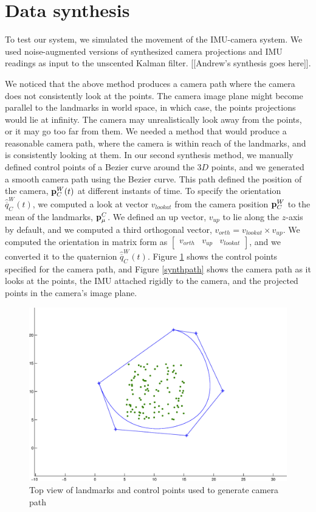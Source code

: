 \section{Data synthesis}
\label{Datasynth}
To test our system, we simulated the movement of the IMU-camera system. We used noise-augmented versions of synthesized camera projections and IMU readings as input to the unscented Kalman filter. [[Andrew's synthesis goes here]].

We noticed that the above method produces a camera path where the camera does not consistently look at the points. The camera image plane might become parallel to the landmarks in world space, in which case, the points projections would lie at infinity. The camera may unrealistically look away from the points, or it may go too far from them. We needed a method that would produce a reasonable camera path, where the camera is within reach of the landmarks, and is consistently looking at them. In our second synthesis method, we manually defined control points of a Bezier curve around the $3D$ points, and we generated a smooth camera path using the Bezier curve. This path defined the position of the camera, $\mathbf{p}_C^W(t)$ at different instants of time. To specify the orientation $\hat{\overline{q}}_C^W(t)$, we computed a look at vector $v_{lookat}$ from the camera position $\mathbf{p}_C^W$ to the mean of the landmarks, $\mathbf{p}_{\mu}^C$. We defined an up vector, $v_{up}$ to lie along the $z$-axis by default, and we computed a third orthogonal vector, $v_{orth}=v_{lookat} \times v_{up}$. We computed the orientation in matrix form as $\begin{bmatrix}v_{orth} &v_{up}& v_{lookat}\end{bmatrix}$, and we converted it to the quaternion $\hat{\overline{q}}_C^W(t)$. Figure \ref{synthcontrolpts} shows the control points specified for the camera path, and Figure \ref{synthpath} shows the camera path as it looks at the points, the IMU attached rigidly to the camera, and the projected points in the camera's image plane.
\begin{figure}[t]
\centering
\includegraphics[width=.5\linewidth]{synth_controlpts.eps}
\caption{Top view of landmarks and control points used to generate camera path}
\label{synthcontrolpts}
\end{figure}
